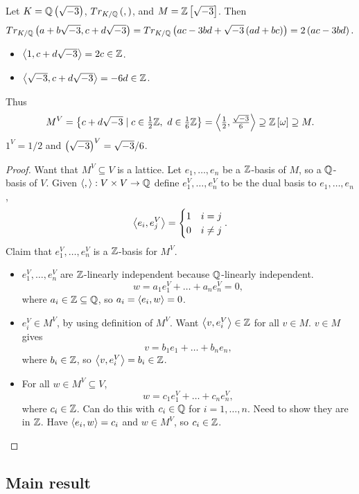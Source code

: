 \begin{example*}
Let $ K = \mathbb{Q}\left( \sqrt{-3} \right) $, $ Tr_{K / \mathbb{Q}}\left( , \right) $, and $ M = \mathbb{Z}\left[ \sqrt{-3} \right] $. Then
$$ Tr_{K / \mathbb{Q}}\left( a + b\sqrt{-3}, c + d\sqrt{-3} \right) = Tr_{K / \mathbb{Q}}\left( ac - 3bd + \sqrt{-3}\left( ad + bc \right) \right) = 2\left( ac - 3bd \right). $$
\begin{itemize}
\item $ \left\langle 1, c + d\sqrt{-3} \right\rangle = 2c \in \mathbb{Z} $.
\item $ \left\langle \sqrt{-3}, c + d\sqrt{-3} \right\rangle = -6d \in \mathbb{Z} $.
\end{itemize}
Thus
$$ M^V = \left\{ c + d\sqrt{-3} \mid c \in \tfrac{1}{2}\mathbb{Z}, \ d \in \tfrac{1}{6}\mathbb{Z} \right\} = \left\langle \tfrac{1}{2}, \tfrac{\sqrt{-3}}{6} \right\rangle \supseteq \mathbb{Z}\left[ \omega \right] \supseteq M. $$
$ 1^V = 1 / 2 $ and $ \left( \sqrt{-3} \right)^V = \sqrt{-3} / 6 $.
\end{example*}

\begin{proof}
Want that $ M^V \subseteq V $ is a lattice. Let $ e_1, \dots, e_n $ be a $ \mathbb{Z} $-basis of $ M $, so a $ \mathbb{Q} $-basis of $ V $. Given $ \left\langle , \right\rangle : V \times V \to \mathbb{Q} $ define $ e_1^V, \dots, e_n^V $ to be the dual basis to $ e_1, \dots, e_n $,
$$ \left\langle e_i, e_j^V \right\rangle =
\begin{cases}
1 & i = j \\
0 & i \ne j
\end{cases}.
$$
Claim that $ e_1^V, \dots, e_n^V $ is a $ \mathbb{Z} $-basis for $ M^V $.
\begin{itemize}
\item $ e_1^V, \dots, e_n^V $ are $ \mathbb{Z} $-linearly independent because $ \mathbb{Q} $-linearly independent.
$$ w = a_1e_1^V + \dots + a_ne_n^V = 0, $$
where $ a_i \in \mathbb{Z} \subseteq \mathbb{Q} $, so $ a_i = \left\langle e_i, w \right\rangle = 0 $.
\item $ e_i^V \in M^V $, by using definition of $ M^V $. Want $ \left\langle v, e_i^V \right\rangle \in \mathbb{Z} $ for all $ v \in M $. $ v \in M $ gives
$$ v = b_1e_1 + \dots + b_ne_n, $$
where $ b_i \in \mathbb{Z} $, so $ \left\langle v, e_i^V \right\rangle = b_i \in \mathbb{Z} $.
\item For all $ w \in M^V \subseteq V $,
$$ w = c_1e_1^V + \dots + c_ne_n^V, $$
where $ c_i \in \mathbb{Z} $. Can do this with $ c_i \in \mathbb{Q} $ for $ i = 1, \dots, n $. Need to show they are in $ \mathbb{Z} $. Have $ \left\langle e_i, w \right\rangle = c_i $ and $ w \in M^V $, so $ c_i \in \mathbb{Z} $.
\end{itemize}
\end{proof}

\pagebreak

\subsection{Main result}


